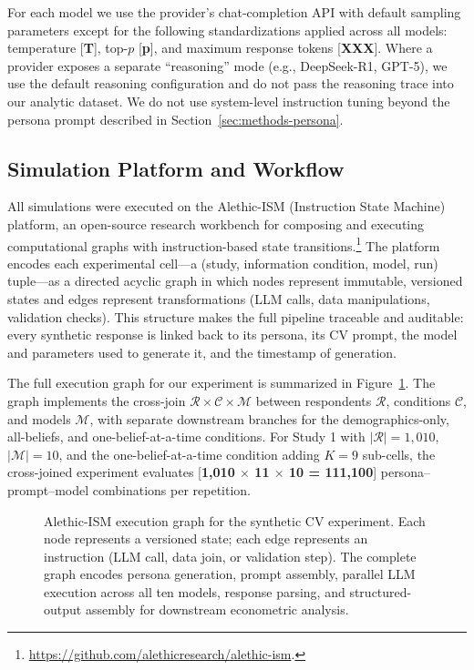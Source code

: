 \documentclass[12pt]{article}
\begin{document}
For each model we use the provider's chat-completion API with default sampling parameters except for the following standardizations applied across all models: temperature [\textbf{T}], top-$p$ [\textbf{p}], and maximum response tokens [\textbf{XXX}]. Where a provider exposes a separate ``reasoning'' mode (e.g., DeepSeek-R1, GPT-5), we use the default reasoning configuration and do not pass the reasoning trace into our analytic dataset. We do not use system-level instruction tuning beyond the persona prompt described in Section~\ref{sec:methods-persona}.

\subsection{Simulation Platform and Workflow}\label{sec:methods-platform}

All simulations were executed on the Alethic-ISM (Instruction State Machine) platform, an open-source research workbench for composing and executing computational graphs with instruction-based state transitions.\footnote{\url{https://github.com/alethicresearch/alethic-ism}.} The platform encodes each experimental cell---a (study, information condition, model, run) tuple---as a directed acyclic graph in which nodes represent immutable, versioned states and edges represent transformations (LLM calls, data manipulations, validation checks). This structure makes the full pipeline traceable and auditable: every synthetic response is linked back to its persona, its CV prompt, the model and parameters used to generate it, and the timestamp of generation.

The full execution graph for our experiment is summarized in Figure~\ref{fig:graph}. The graph implements the cross-join $\mathcal{R} \times \mathcal{C} \times \mathcal{M}$ between respondents $\mathcal{R}$, conditions $\mathcal{C}$, and models $\mathcal{M}$, with separate downstream branches for the demographics-only, all-beliefs, and one-belief-at-a-time conditions. For Study 1 with $|\mathcal{R}| = 1{,}010$, $|\mathcal{M}| = 10$, and the one-belief-at-a-time condition adding $K = 9$ sub-cells, the cross-joined experiment evaluates [\textbf{1{,}010 $\times$ 11 $\times$ 10 = 111{,}100}] persona--prompt--model combinations per repetition.

\begin{figure}[h]
    \centering
    \caption{Alethic-ISM execution graph for the synthetic CV experiment. Each node represents a versioned state; each edge represents an instruction (LLM call, data join, or validation step). The complete graph encodes persona generation, prompt assembly, parallel LLM execution across all ten models, response parsing, and structured-output assembly for downstream econometric analysis.}
    \label{fig:graph}
\end{figure}
\end{document}
